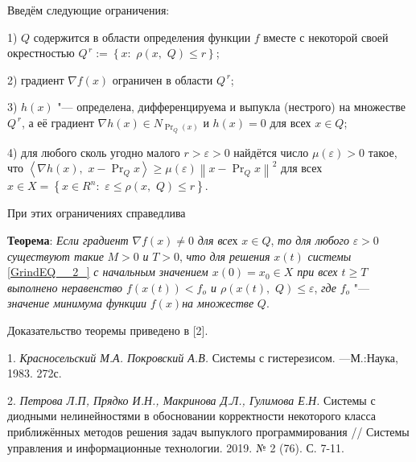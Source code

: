 Введём следующие ограничения:

1) $Q$ содержится в области определения функции $f$ вместе с некоторой своей окрестностью $Q^{\, r} :=\left\{x:\, \, \rho \left(x,\, \, Q\right)\le r\right\}$;

2) градиент $\nabla f\left(x\right)$ ограничен в области $Q^{\, r} $;

3) $h\left(x\right)$ "--- определена, дифференцируема и выпукла (нестрого) на множестве \textit{$Q^{\, r} $}, а её градиент $\nabla h\left(x\right)\in N_{\Pr _{Q} \left(x\right)} $ и $h\left(x\right)=0$ для всех $x\in Q$;

4) для любого сколь угодно малого \textit{$r>\varepsilon >0$} найдётся число $\mu \left(\varepsilon \right)>0$ такое, что $\left\langle \nabla h\left(x\right),\, \, x-\Pr _{Q} x\right\rangle \ge \mu \left(\varepsilon \right)\left\| x-\Pr _{Q} x\right\| ^{2} $ для всех $x\in X=\left\{x\in R^{n} :\, \, \varepsilon \le \rho \left(x,\, \, Q\right)\le r\right\}$.

При этих ограничениях справедлива

\textbf{Теорема}: \textit{Если градиент }$\nabla f\left(x\right)\ne 0$\textit{ для все}х $x\in Q$, \textit{то для любого }$\varepsilon >0$\textit{ существуют такие }$M>0$\textit{ и }$T>0$, \textit{что для решения }$x\left(t\right)$\textit{ системы }\eqref{GrindEQ__2_}\textit{ с начальным значением $x\left(0\right)=x_{0} \in X$ при всех $t\ge T$ выполнено неравенство $f\left(x\left(t\right)\right)<f_{o} $ и $\rho \left(x\left(t\right),\, \, Q\right)\le \varepsilon $}, \textit{где }$f_{o} $ "--- \textit{значение минимума функции }$f\left(x\right)$\textit{на множестве }$Q$.

 Доказательство теоремы приведено в [2].

\litlist

1.
{\it Красносельский М.А. Покровский А.В.} Системы с гистерезисом. ---М.:Наука, 1983. 272с.

2.
{\it  Петрова Л.П, Прядко И.Н., Макринова Д.Л., Гулимова Е.Н.} Системы с диодными нелинейностями в обосновании корректности некоторого класса приближённых методов решения задач выпуклого программирования  // Системы управления и информационные технологии. 2019. № 2 (76). С. 7-11.



